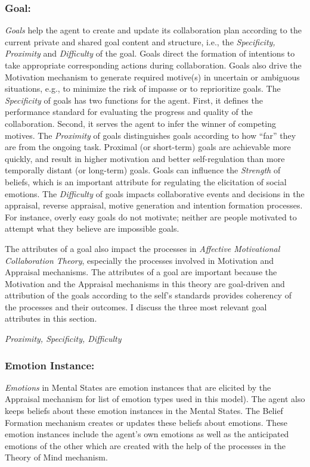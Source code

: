 \documentclass[letterpaper]{article}
\begin{document}
\subsubsection{Goal:}

\textit{Goals} help the agent to create and update its collaboration plan
according to the current private and shared goal content and structure, i.e.,
the \textit{Specificity, Proximity} and \textit{Difficulty} of the goal. Goals
direct the formation of intentions to take appropriate corresponding actions
during collaboration. Goals also drive the Motivation mechanism to generate
required motive(s) in uncertain or ambiguous situations, e.g., to minimize the
risk of impasse or to reprioritize goals. The \textit{Specificity} of goals has
two functions for the agent. First, it defines the performance standard for
evaluating the progress and quality of the collaboration. Second, it serves the
agent to infer the winner of competing motives. The \textit{Proximity} of goals
distinguishes goals according to how ``far'' they are from the ongoing task.
Proximal (or short-term) goals are achievable more quickly, and result in higher
motivation and better self-regulation than more temporally distant (or
long-term) goals. Goals can influence the \textit{Strength} of beliefs, which is
an important attribute for regulating the elicitation of social emotions. The
\textit{Difficulty} of goals impacts collaborative events and decisions in the
appraisal, reverse appraisal, motive generation and intention formation
processes. For instance, overly easy goals do not motivate; neither are people
motivated to attempt what they believe are impossible goals.

The attributes of a goal also impact the processes in \textit{Affective
Motivational Collaboration Theory}, especially the processes involved in
Motivation and Appraisal mechanisms. The attributes of a goal are important
because the Motivation and the Appraisal mechanisms in this theory are
goal-driven and attribution of the goals according to the self's standards
provides coherency of the processes and their outcomes. I discuss the three most
relevant goal attributes in this section.

\textit{Proximity, Specificity, Difficulty}

\subsubsection{Emotion Instance:}

\textit{Emotions} in Mental States are emotion instances that are elicited by
the Appraisal mechanism for list of emotion types used in this model). The agent
also keeps beliefs about these emotion instances in the Mental States. The
Belief Formation mechanism creates or updates these beliefs about emotions.
These emotion instances include the agent's own emotions as well as the
anticipated emotions of the other which are created with the help of the
processes in the Theory of Mind mechanism.
\end{document}
